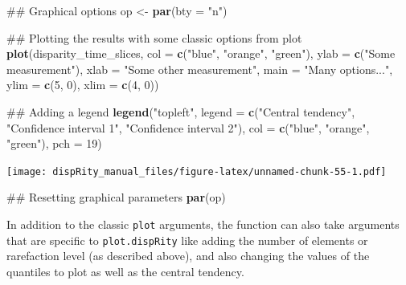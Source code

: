 \documentclass[]{book}
\newenvironment{Shaded}{\begin{snugshade}}{\end{snugshade}}
\newcommand{\KeywordTok}[1]{\textcolor[rgb]{0.13,0.29,0.53}{\textbf{#1}}}
\newcommand{\DataTypeTok}[1]{\textcolor[rgb]{0.13,0.29,0.53}{#1}}
\newcommand{\DecValTok}[1]{\textcolor[rgb]{0.00,0.00,0.81}{#1}}
\newcommand{\StringTok}[1]{\textcolor[rgb]{0.31,0.60,0.02}{#1}}
\newcommand{\NormalTok}[1]{#1}
\theoremstyle{definition}
\theoremstyle{definition}
\theoremstyle{definition}
\theoremstyle{remark}
\begin{document}
\begin{Shaded}
\begin{Highlighting}[]
\NormalTok{## Graphical options}
\NormalTok{op <-}\StringTok{ }\KeywordTok{par}\NormalTok{(}\DataTypeTok{bty =} \StringTok{"n"}\NormalTok{)}

\NormalTok{## Plotting the results with some classic options from plot}
\KeywordTok{plot}\NormalTok{(disparity_time_slices, }\DataTypeTok{col =} \KeywordTok{c}\NormalTok{(}\StringTok{"blue"}\NormalTok{, }\StringTok{"orange"}\NormalTok{, }\StringTok{"green"}\NormalTok{),}
    \DataTypeTok{ylab =} \KeywordTok{c}\NormalTok{(}\StringTok{"Some measurement"}\NormalTok{), }\DataTypeTok{xlab =} \StringTok{"Some other measurement"}\NormalTok{,}
    \DataTypeTok{main =} \StringTok{"Many options..."}\NormalTok{, }\DataTypeTok{ylim =} \KeywordTok{c}\NormalTok{(}\DecValTok{5}\NormalTok{, }\DecValTok{0}\NormalTok{), }\DataTypeTok{xlim =} \KeywordTok{c}\NormalTok{(}\DecValTok{4}\NormalTok{, }\DecValTok{0}\NormalTok{))}

\NormalTok{## Adding a legend}
\KeywordTok{legend}\NormalTok{(}\StringTok{"topleft"}\NormalTok{, }\DataTypeTok{legend =} \KeywordTok{c}\NormalTok{(}\StringTok{"Central tendency"}\NormalTok{,}
                             \StringTok{"Confidence interval 1"}\NormalTok{,}
                            \StringTok{"Confidence interval 2"}\NormalTok{),}
      \DataTypeTok{col =} \KeywordTok{c}\NormalTok{(}\StringTok{"blue"}\NormalTok{, }\StringTok{"orange"}\NormalTok{, }\StringTok{"green"}\NormalTok{), }\DataTypeTok{pch =} \DecValTok{19}\NormalTok{)}
\end{Highlighting}
\end{Shaded}

\texttt{[image: dispRity\_manual\_files/figure-latex/unnamed-chunk-55-1.pdf]}

\begin{Shaded}
\begin{Highlighting}[]
\NormalTok{## Resetting graphical parameters}
\KeywordTok{par}\NormalTok{(op)}
\end{Highlighting}
\end{Shaded}

In addition to the classic \texttt{plot} arguments, the function can
also take arguments that are specific to \texttt{plot.dispRity} like
adding the number of elements or rarefaction level (as described above),
and also changing the values of the quantiles to plot as well as the
central tendency.
\end{document}
